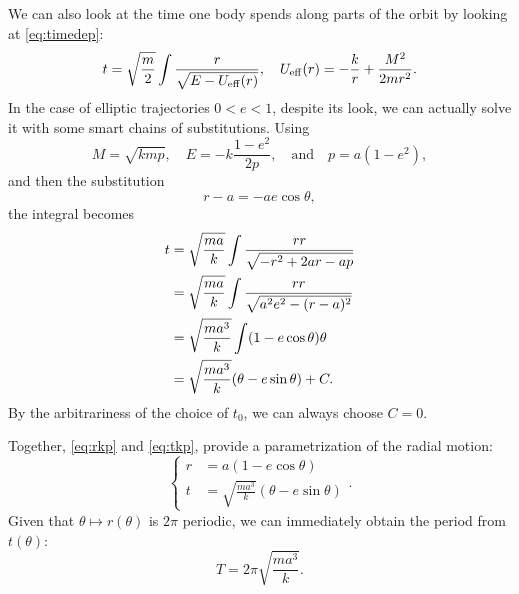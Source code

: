 \documentclass[english,fontsize=11pt,paper=a5,oneside]{scrbook}
\let\d\relax
\newcommand{\d}{\mathrm{d}}
\theoremstyle{definition}
\begin{document}
We can also look at the time one body spends along parts of the orbit by looking at \eqref{eq:timedep}:
\begin{equation}
  t = \sqrt{\frac{m}{2}}
  \int \frac{\d r}{\sqrt{E - U_{\mathrm{eff}}(r)}}, \quad U_{\mathrm{eff}}(r) = -\frac kr + \frac {M^2}{2 m r^2}.
\end{equation}
In the case of elliptic trajectories $0<e<1$, despite its look, we can actually solve it with some smart chains of substitutions. Using
\begin{equation}
  M = \sqrt{kmp}, \quad E = -k \frac{1-e^2}{2p}, \quad\mbox{and}\quad p= a(1-e^2),
\end{equation}
and then the substitution
\begin{equation}\label{eq:rkp}
  r - a = - a e \cos \theta,
\end{equation}
the integral becomes
\begin{align}
  t & = \sqrt{\frac {ma}k} \int \frac{r\d r}{\sqrt{-r^2 + 2ar -ap}}      \\
    & = \sqrt{\frac {ma}k} \int \frac{r\d r}{\sqrt{a^2e^2 - (r-a)^2}}    \\
    & = \sqrt{\frac{ma^3}{k}} \int (1- e \cos\theta) \d \theta           \\
    & = \sqrt{\frac{ma^3}{k}} (\theta- e \sin\theta) + C. \label{eq:tkp}
\end{align}
By the arbitrariness of the choice of $t_0$, we can always choose $C=0$.

Together, \eqref{eq:rkp} and \eqref{eq:tkp}, provide a parametrization of the radial motion:
\begin{equation}
  \left\lbrace
  \begin{aligned}
    r & = a(1-e\cos\theta)                          \\
    t & = \sqrt{\frac{ma^3}k}(\theta - e\sin\theta)
  \end{aligned}
  \right..
\end{equation}
Given that $\theta\mapsto r(\theta)$ is $2\pi$ periodic, we can immediately obtain the period from $t(\theta)$:
\begin{equation}
  T = 2\pi \sqrt{\frac{ma^3}k}.
\end{equation}
\end{document}
